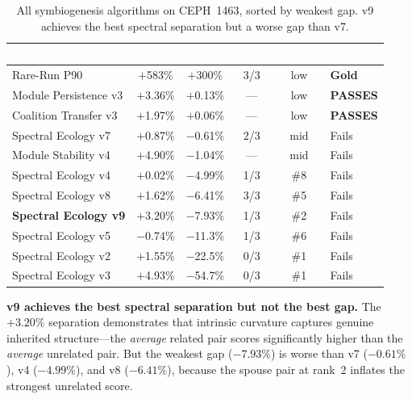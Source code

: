 \documentclass{../yalumba}
\begin{document}
\begin{table}[H]
  \centering
  \tablestyle
  \caption{All symbiogenesis algorithms on CEPH~1463, sorted by weakest gap.
    v9 achieves the best spectral separation but a worse gap than v7.}
  \label{tab:all}
  \begin{tabular}{lccccl}
    \toprule
    \rowcolor{table-header}
    \textcolor{white}{\textbf{Algorithm}} &
    \textcolor{white}{\textbf{Sep}} &
    \textcolor{white}{\textbf{Gap}} &
    \textcolor{white}{\textbf{Top-3}} &
    \textcolor{white}{\textbf{Spouse}} &
    \textcolor{white}{\textbf{Status}} \\
    \midrule
    Rare-Run P90
      & $+$583\% & $+$300\% & 3/3 & low & \textbf{Gold} \\
    Module Persistence v3
      & $+$3.36\% & $+$0.13\% & --- & low & \textbf{PASSES} \\
    Coalition Transfer v3
      & $+$1.97\% & $+$0.06\% & --- & low & \textbf{PASSES} \\
    Spectral Ecology v7
      & $+$0.87\% & $-$0.61\% & 2/3 & mid & Fails \\
    Module Stability v4
      & $+$4.90\% & $-$1.04\% & --- & mid & Fails \\
    Spectral Ecology v4
      & $+$0.02\% & $-$4.99\% & 1/3 & \#8 & Fails \\
    Spectral Ecology v8
      & $+$1.62\% & $-$6.41\% & 3/3 & \#5 & Fails \\
    \textbf{Spectral Ecology v9}
      & $\mathbf{+3.20\%}$ & $-$7.93\% & 1/3 & \#2 & Fails \\
    Spectral Ecology v5
      & $-$0.74\% & $-$11.3\% & 1/3 & \#6 & Fails \\
    Spectral Ecology v2
      & $+$1.55\% & $-$22.5\% & 0/3 & \#1 & Fails \\
    Spectral Ecology v3
      & $+$4.93\% & $-$54.7\% & 0/3 & \#1 & Fails \\
    \bottomrule
  \end{tabular}
\end{table}


\begin{keyfinding}
\textbf{v9 achieves the best spectral separation but not the best gap.}
The $+3.20\%$ separation demonstrates that intrinsic curvature captures
genuine inherited structure---the \emph{average} related pair scores
significantly higher than the \emph{average} unrelated pair.  But the
weakest gap ($-7.93\%$) is worse than v7 ($-0.61\%$), v4 ($-4.99\%$),
and v8 ($-6.41\%$), because the spouse pair at rank~2 inflates the
strongest unrelated score.
\end{keyfinding}
\end{document}
